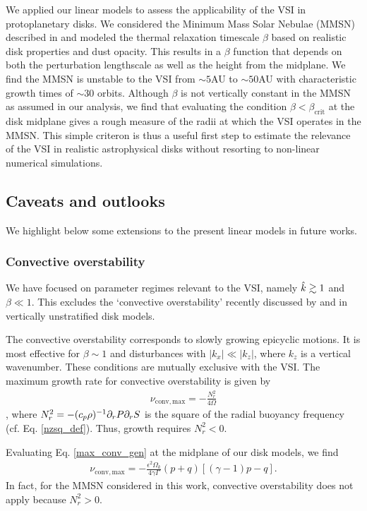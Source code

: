 
We applied our linear models to assess the applicability of the VSI in
protoplanetary disks. We considered the Minimum Mass Solar Nebulae
(MMSN) described in \cite{chiang10} and   
modeled the thermal relaxation timescale $\beta$ based on realistic
disk properties and dust opacity. This results in a $\beta$ function that
depends on both the perturbation lengthscale as well as the height 
from the midplane. We find the MMSN is unstable to the VSI 
from $\sim 5$AU to $\sim50$AU with characteristic growth times of
$\sim 30$ orbits. Although $\beta$ is not vertically constant in the
MMSN as assumed in our analysis, we find that evaluating the condition
$\beta <\beta_\mathrm{crit}$ at the disk midplane gives a rough measure of the
radii at which the VSI operates in the MMSN. This simple criteron is
thus a useful first step to estimate the relevance of the VSI in
realistic astrophysical disks without resorting to non-linear
numerical simulations.  

\subsection{Caveats and outlooks} 
We highlight below some extensions to the present  
linear models in future works.  

\subsubsection{Convective overstability}
We have focused on parameter regimes relevant to the VSI,
namely $\hat{k}\gtrsim 1$ and $\beta\ll 1$. This excludes the
`convective overstability' recently discussed by \cite{klahr14} and
\cite{lyra14} in vertically unstratified disk models. 

The convective overstability corresponds to slowly growing epicyclic motions.
It is most effective for $\beta\sim 1$ and disturbances with $|k_x|\ll |k_z|$, where
$k_z$ is a vertical wavenumber. These conditions are mutually exclusive with the VSI. 
The maximum growth rate for convective overstability is given by 
\begin{align}
  \nu_\mathrm{conv,max} = -\frac{N^2_r}{4\Omega}\label{max_conv_gen}
\end{align}
\citep{lyra14}, where $N_r^2 = -(c_p\rho)^{-1}\partial_rP\partial_rS$ is the
square of the radial buoyancy frequency
(cf. Eq. \ref{nzsq_def}). Thus, growth requires $N_r^2<0$.  

Evaluating Eq. \ref{max_conv_gen} at the midplane of our disk models,
we find  
\begin{align}
  \nu_\mathrm{conv,max} =
  -\frac{\epsilon^2\Omega_k}{4\gamma\Gamma}\left(p+q\right)
  \left[\left(\gamma-1\right)p-q\right]. \label{max_conv}
\end{align}
In fact, for the MMSN considered in this work, convective
overstability does not apply because 
$N_r^2>0$.   

